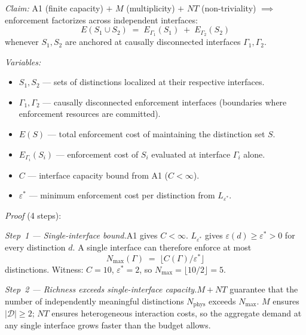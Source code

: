 \documentclass[11pt]{article}
\newcommand{\eps}{\varepsilon}
\newcommand{\Lloc}{L_{\mathrm{loc}}}
\newcommand{\Leps}{L_{\eps^*}}
\begin{document}
\begin{tcolorbox}[apfbox, title={Lemma $\Lloc$ (Locality) --- Full Proof}]
\textit{Claim:} A1 (finite capacity) $+$ $M$ (multiplicity) $+$ $NT$ (non-triviality) $\implies$ enforcement factorizes across independent interfaces:
\begin{equation}
E(S_1 \cup S_2) \;=\; E_{\Gamma_1}(S_1) \;+\; E_{\Gamma_2}(S_2)
\label{eq:lloc_factorization}
\end{equation}
whenever $S_1, S_2$ are anchored at causally disconnected interfaces $\Gamma_1, \Gamma_2$.

\smallskip\noindent\textit{Variables:}
\begin{itemize}[nosep,leftmargin=2em]
\item $S_1, S_2$ --- sets of distinctions localized at their respective interfaces.
\item $\Gamma_1, \Gamma_2$ --- causally disconnected enforcement interfaces (boundaries where enforcement resources are committed).
\item $E(S)$ --- total enforcement cost of maintaining the distinction set $S$.
\item $E_{\Gamma_i}(S_i)$ --- enforcement cost of $S_i$ evaluated at interface $\Gamma_i$ alone.
\item $C$ --- interface capacity bound from A1 ($C < \infty$).
\item $\eps^*$ --- minimum enforcement cost per distinction from $\Leps$.
\end{itemize}
\end{tcolorbox}

\textit{Proof} (4 steps):

\textit{Step~1 --- Single-interface bound.}\quad A1 gives $C < \infty$.  $\Leps$ gives $\eps(d) \ge \eps^* > 0$ for every distinction $d$.  A single interface can therefore enforce at most
\begin{equation}
N_{\max}(\Gamma) \;=\; \bigl\lfloor C(\Gamma)/\eps^* \bigr\rfloor
\end{equation}
distinctions.  Witness: $C = 10$, $\eps^* = 2$, so $N_{\max} = \lfloor 10/2 \rfloor = 5$.

\textit{Step~2 --- Richness exceeds single-interface capacity.}\quad $M + NT$ guarantee that the number of independently meaningful distinctions $N_{\mathrm{phys}}$ exceeds $N_{\max}$.  $M$ ensures $|\mathcal{D}| \ge 2$; $NT$ ensures heterogeneous interaction costs, so the aggregate demand at any single interface grows faster than the budget allows.
\end{document}
